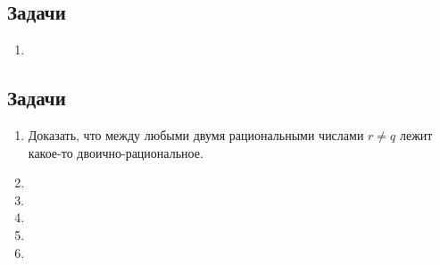 \subsection*{Задачи}

\begin{enumerate}
\item
\end{enumerate}

\subsection*{Задачи}
\begin{enumerate}
\item Доказать, что между любыми двумя рациональными числами $r\ne q$ лежит какое-то двоично-рациональное.
\item 
\item 
\item 
\item 
\item 
\end{enumerate}








